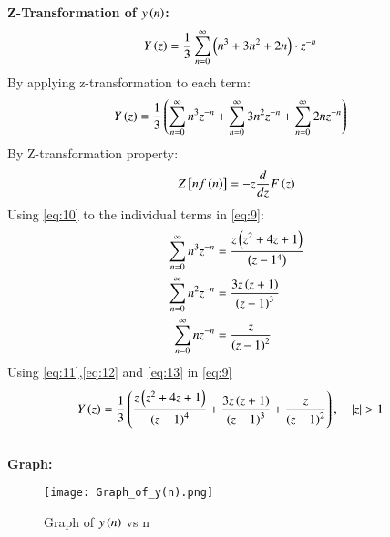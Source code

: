 \documentclass[journal,12pt,twocolumn]{IEEEtran}
\theoremstyle{remark}
\begin{document}
\textbf{Z-Transformation of $y\left(n\right)$:}\\
\begin{align}
Y\left(z\right)&=\frac{1}{3} \sum_{n=0}^{\infty} \left(n^3 + 3n^2 + 2n\right)\cdot z^{-n}\label{eq:8}
\end{align}
By applying z-transformation to each term:
\begin{align}
    Y\left(z\right)&=\frac{1}{3}\left(\sum_{n=0}^{\infty}n^3 z^{-n}+\sum_{n=0}^{\infty}3n^2z^{-n}+\sum_{n=0}^{\infty}2nz^{-n}\right) \label{eq:9}
\end{align}
By Z-transformation property:
\begin{align}
Z{}\left[nf\left(n\right)\right]=-z\frac{d}{dz}F\left(z\right)\label{eq:10}
\end{align}
Using \eqref{eq:10} to the individual terms in \eqref{eq:9}:
\begin{align}
\sum_{n=0}^{\infty}n^3 z^{-n}&=\frac{z\left(z^2+4z+1\right)}{\left(z-1^4\right)}\label{eq:11}\\
\sum_{n=0}^{\infty}n^2z^{-n}&=\frac{3z\left(z+1\right)}{\left(z-1\right)^3}\label{eq:12}\\
\sum_{n=0}^{\infty}nz^{-n}&= \frac{z}{\left(z-1\right)^2}\label{eq:13}
\end{align}
Using \eqref{eq:11},\eqref{eq:12} and \eqref{eq:13} in \eqref{eq:9}
\begin{align}
    Y\left(z\right)&=\frac{1}{3} \left(\frac{z\left(z^2+4z+1\right)}{\left(z-1\right)^4} + \frac{3z\left(z+1\right)}{\left(z-1\right)^3} + \frac{z}{\left(z-1\right)^2}\right),\quad\left\vert z\right\vert>1\label{eq:14}
\end{align}\\
\textbf{Graph:}
\begin{figure}[h]
        \centering
\texttt{[image: Graph\_of\_y(n).png]}
\caption{Graph of $y\left(n\right)$ vs n}
\label{fig:enter-label}
\end{figure}
\end{document}

